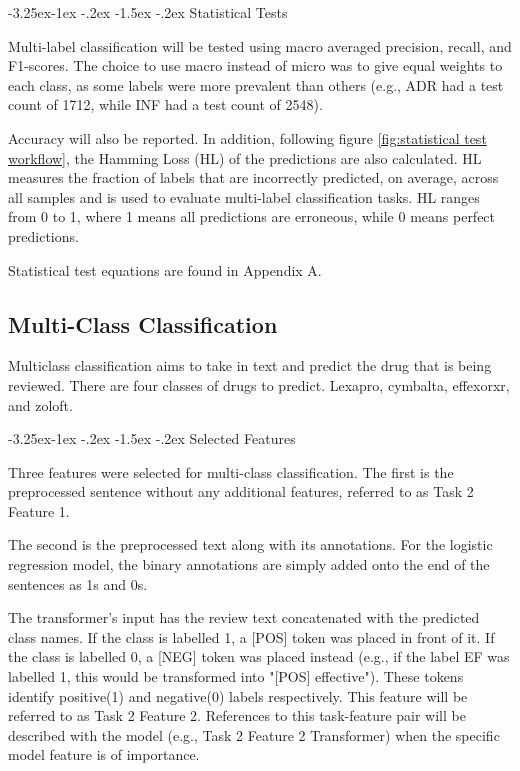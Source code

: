 \documentclass[10.7pt, onecolumn]{article}
\makeatletter
\renewcommand\subsubsection{\@startsection{subsubsection}{3}{\z@}%
	{-3.25ex\@plus -1ex \@minus -.2ex}%
    {-1.5ex \@plus -.2ex}%
    {\normalfont\itshape}}
\makeatother
\begin{document}
\subsubsection{Statistical Tests}

Multi-label classification will be tested using macro averaged precision, recall, and F1-scores. The choice to use macro instead of micro was to give equal weights to each class, as some labels were more prevalent than others (e.g., ADR had a test count of 1712, while INF had a test count of 2548).

Accuracy will also be reported. In addition, following figure \ref{fig:statistical test workflow}, the Hamming Loss (HL) of the predictions are also calculated. HL measures the fraction of labels that are incorrectly predicted, on average, across all samples and is used to evaluate multi-label classification tasks\cite{hammingloss}. HL ranges from 0 to 1, where 1 means all predictions are erroneous, while 0 means perfect predictions.

Statistical test equations are found in Appendix A.

\subsection{Multi-Class Classification}

Multiclass classification aims to take in text and predict the drug that is being reviewed. There are four classes of drugs to predict. Lexapro, cymbalta, effexorxr, and zoloft.

\subsubsection{Selected Features}

Three features were selected for multi-class classification. The first is the preprocessed sentence without any additional features, referred to as Task 2 Feature 1. 

The second is the preprocessed text along with its annotations. For the logistic regression model, the binary annotations are simply added onto the end of the sentences as 1s and 0s. 

The transformer's input has the review text concatenated with the predicted class names. If the class is labelled 1, a [POS] token was placed in front of it. If the class is labelled 0, a [NEG] token was placed instead (e.g., if the label EF was labelled 1, this would be transformed into "[POS] effective"). These tokens identify positive(1) and negative(0) labels respectively. This feature will be referred to as Task 2 Feature 2. References to this task-feature pair will be described with the model (e.g., Task 2 Feature 2 Transformer) when the specific model feature is of importance.
\end{document}
